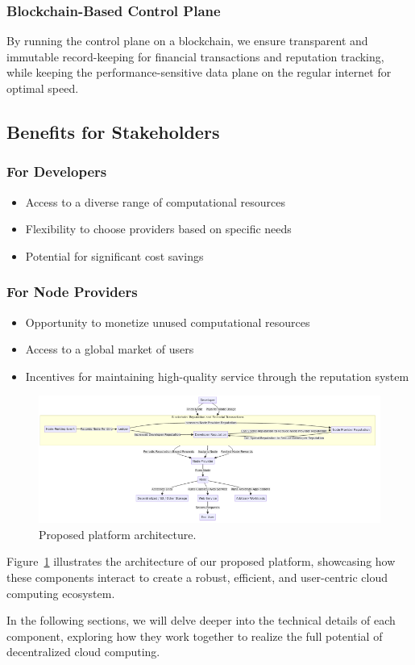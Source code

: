 \subsubsection{Blockchain-Based Control Plane}
By running the control plane on a blockchain, we ensure transparent and immutable record-keeping for financial transactions and reputation tracking, while keeping the performance-sensitive data plane on the regular internet for optimal speed.

\subsection{Benefits for Stakeholders}

\subsubsection{For Developers}
\begin{itemize}
    \item Access to a diverse range of computational resources
    \item Flexibility to choose providers based on specific needs
    \item Potential for significant cost savings
\end{itemize}

\subsubsection{For Node Providers}
\begin{itemize}
    \item Opportunity to monetize unused computational resources
    \item Access to a global market of users
    \item Incentives for maintaining high-quality service through the reputation system
\end{itemize}

\begin{figure}[h]
    \centering
    \includegraphics[width=\textwidth]{figures/proposed_architecture.png}
    \caption{Proposed platform architecture.}
    \label{fig:proposed-architecture}
\end{figure}

Figure~\ref{fig:proposed-architecture} illustrates the architecture of our proposed platform, showcasing how these components interact to create a robust, efficient, and user-centric cloud computing ecosystem.

In the following sections, we will delve deeper into the technical details of each component, exploring how they work together to realize the full potential of decentralized cloud computing.
